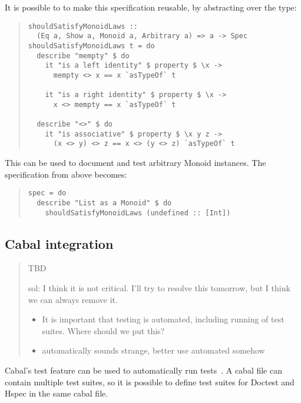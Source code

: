 \documentclass[preprint]{sigplanconf}
\begin{document}
\noindent It is possible to to make this specification reusable, by
abstracting over the type:

\begin{quote}
\small
\begin{verbatim}
shouldSatisfyMonoidLaws ::
  (Eq a, Show a, Monoid a, Arbitrary a) => a -> Spec
shouldSatisfyMonoidLaws t = do
  describe "mempty" $ do
    it "is a left identity" $ property $ \x ->
      mempty <> x == x `asTypeOf` t

    it "is a right identity" $ property $ \x ->
      x <> mempty == x `asTypeOf` t

  describe "<>" $ do
    it "is associative" $ property $ \x y z ->
      (x <> y) <> z == x <> (y <> z) `asTypeOf` t
\end{verbatim}
\end{quote}

\noindent This can be used to document and test arbitrary Monoid
instances.
The specification from above becomes:

\begin{quote}
\small
\begin{verbatim}
spec = do
  describe "List as a Monoid" $ do
    shouldSatisfyMonoidLaws (undefined :: [Int])
\end{verbatim}
\end{quote}

\subsection{Cabal integration}

\begin{quote}
    TBD

    sol: I think it is not critical.  I'll try to resolve this
    tomorrow, but I think we can always remove it.

\begin{itemize}

\item It is important that testing is automated, including running of test
    suites.  Where should we put this?

\item automatically sounds strange, better use automated somehow
\end{itemize}
\end{quote}

\noindent Cabal's test feature can be used to automatically run tests~\cite{cabal}.  A cabal
file can contain multiple test suites, so it is possible to define test suites
for Doctest and Hspec in the same cabal file.
\end{document}
